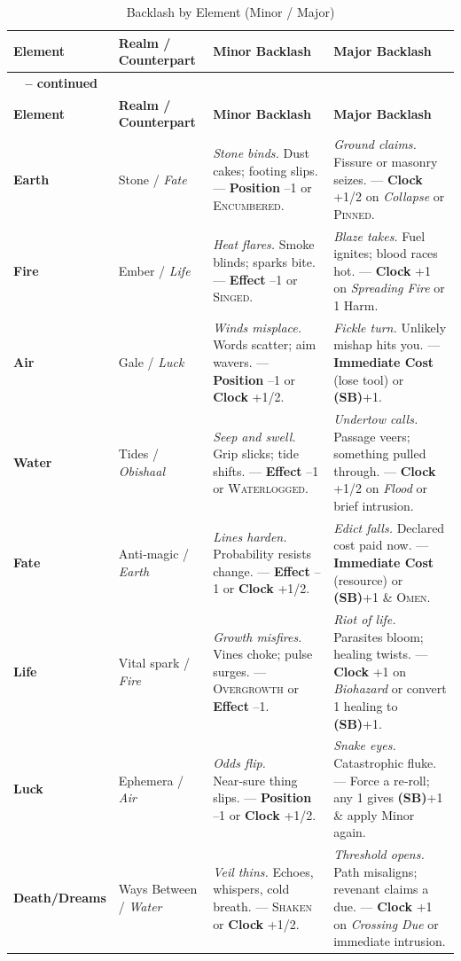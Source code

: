 \begin{longtable}{>{\bfseries}l l >{\raggedright}X >{\raggedright}X}
\caption{Backlash by Element (Minor / Major)}\label{tab:backlash_8x2}\\
\toprule
\textbf{Element} & \textbf{Realm / Counterpart} & \textbf{Minor Backlash} & \textbf{Major Backlash} \\
\midrule
\endfirsthead
\multicolumn{4}{c}%
{{\bfseries \tablename\ \thetable{} -- continued}} \\
\toprule
\textbf{Element} & \textbf{Realm / Counterpart} & \textbf{Minor Backlash} & \textbf{Major Backlash} \\
\midrule
\endhead
\bottomrule
\endfoot
Earth & Stone / \emph{Fate} & \emph{Stone binds.} Dust cakes; footing slips. --- \textbf{Position} --1 or \textsc{Encumbered}. & \emph{Ground claims.} Fissure or masonry seizes. --- \textbf{Clock} +1/2 on \emph{Collapse} or \textsc{Pinned}. \\
Fire & Ember / \emph{Life} & \emph{Heat flares.} Smoke blinds; sparks bite. --- \textbf{Effect} --1 or \textsc{Singed}. & \emph{Blaze takes.} Fuel ignites; blood races hot. --- \textbf{Clock} +1 on \emph{Spreading Fire} or 1 Harm. \\
Air & Gale / \emph{Luck} & \emph{Winds misplace.} Words scatter; aim wavers. --- \textbf{Position} --1 or \textbf{Clock} +1/2. & \emph{Fickle turn.} Unlikely mishap hits you. --- \textbf{Immediate Cost} (lose tool) or \textbf{(SB)}+1. \\
Water & Tides / \emph{Obishaal} & \emph{Seep and swell.} Grip slicks; tide shifts. --- \textbf{Effect} --1 or \textsc{Waterlogged}. & \emph{Undertow calls.} Passage veers; something pulled through. --- \textbf{Clock} +1/2 on \emph{Flood} or brief intrusion. \\
Fate & Anti‑magic / \emph{Earth} & \emph{Lines harden.} Probability resists change. --- \textbf{Effect} --1 or \textbf{Clock} +1/2. & \emph{Edict falls.} Declared cost paid now. --- \textbf{Immediate Cost} (resource) or \textbf{(SB)}+1 \& \textsc{Omen}. \\
Life & Vital spark / \emph{Fire} & \emph{Growth misfires.} Vines choke; pulse surges. --- \textsc{Overgrowth} or \textbf{Effect} --1. & \emph{Riot of life.} Parasites bloom; healing twists. --- \textbf{Clock} +1 on \emph{Biohazard} or convert 1 healing to \textbf{(SB)}+1. \\
Luck & Ephemera / \emph{Air} & \emph{Odds flip.} Near‑sure thing slips. --- \textbf{Position} --1 or \textbf{Clock} +1/2. & \emph{Snake eyes.} Catastrophic fluke. --- Force a re‑roll; any 1 gives \textbf{(SB)}+1 \& apply Minor again. \\
Death/Dreams & Ways Between / \emph{Water} & \emph{Veil thins.} Echoes, whispers, cold breath. --- \textsc{Shaken} or \textbf{Clock} +1/2. & \emph{Threshold opens.} Path misaligns; revenant claims a due. --- \textbf{Clock} +1 on \emph{Crossing Due} or immediate intrusion. \\
\end{longtable}

